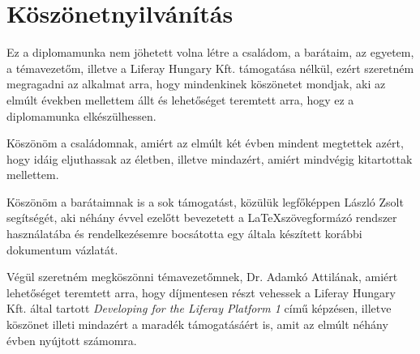 \documentclass[hidelinks, 12pt, a4paper]{report}
\begin{document}
\clearpage
{}
\chapter*{Köszönetnyilvánítás}

Ez a diplomamunka nem jöhetett volna létre a családom, a barátaim, az egyetem, a témavezetőm, illetve a Liferay Hungary Kft. támogatása nélkül, ezért szeretném megragadni az alkalmat arra, hogy mindenkinek köszönetet mondjak, aki az elmúlt években mellettem állt és lehetőséget teremtett arra, hogy ez a diplomamunka elkészülhessen.

Köszönöm a családomnak, amiért az elmúlt két évben mindent megtettek azért, hogy idáig eljuthassak az életben, illetve mindazért, amiért mindvégig kitartottak mellettem.

Köszönöm a barátaimnak is a sok támogatást, közülük legfőképpen László Zsolt segítségét, aki néhány évvel ezelőtt bevezetett a \LaTeX szövegformázó rendszer használatába és rendelkezésemre bocsátotta egy általa készített korábbi dokumentum vázlatát.

Végül szeretném megköszönni témavezetőmnek, Dr. Adamkó Attilának, amiért lehetőséget teremtett arra, hogy díjmentesen részt vehessek a Liferay Hungary Kft. által tartott \emph{Developing for the Liferay Platform 1} című képzésen, illetve köszönet illeti mindazért a maradék támogatásáért is, amit az elmúlt néhány évben nyújtott számomra.

\end{document}
